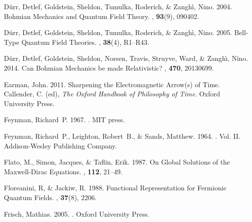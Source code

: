 \documentclass[12pt,secnumarabic,amsmath,amssymb,balancelastpage,nofootinbib]{article}
\begin{document}
\begin{thebibliography}{}
D{\"u}rr, Detlef, Goldstein, Sheldon, Tumulka, Roderich, \& Zangh\`{i}, Nino.
  2004.
\newblock Bohmian Mechanics and Quantum Field Theory.
, {\bf 93}(9), 090402.

D{\"u}rr, Detlef, Goldstein, Sheldon, Tumulka, Roderich, \& Zangh\`{i}, Nino.
  2005.
\newblock Bell-Type Quantum Field Theories.
, {\bf 38}(4),
  R1--R43.

D\"{u}rr, Detlef, Goldstein, Sheldon, Norsen, Travis, Struyve, Ward, \&
  Zangh\`{\i}, Nino. 2014.
\newblock Can Bohmian Mechanics be made Relativistic?
, {\bf 470}, 20130699.

Earman, John. 2011.
\newblock Sharpening the Electromagnetic Arrow(s) of Time.
 Callender, C. (ed), {\em The Oxford
  Handbook of Philosophy of Time}.
\newblock Oxford University Press.

Feynman, Richard~P. 1967.
.
\newblock MIT press.

Feynman, Richard~P., Leighton, Robert~B., \& Sands, Matthew. 1964.
.
\newblock  Vol. II.
\newblock Addison-Wesley Publishing Company.

Flato, M., Simon, Jacques, \& Taflin, Erik. 1987.
\newblock On Global Solutions of the Maxwell-Dirac Equations.
, {\bf 112}, 21--49.

Floreanini, R, \& Jackiw, R. 1988.
\newblock Functional Representation for Fermionic Quantum Fields.
, {\bf 37}(8), 2206.

Frisch, Mathias. 2005.
.
\newblock Oxford University Press.


\end{thebibliography}
\end{document}
